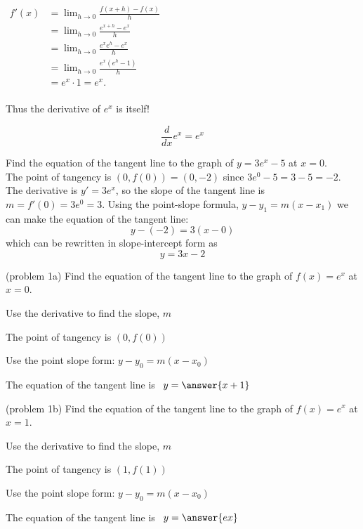 \documentclass{ximera}
\begin{document}
\begin{center}
$\begin{aligned}
f'(x) &= \lim_{h \to 0} \frac{f(x+h)-f(x)}{h} \\[5pt]
&= \lim_{h \to 0}\frac{e^{x+h}-e^x}{h}\\[5pt]
&= \lim_{h \to 0} \frac{e^x e^h-e^x}{h}\\[5pt]
&= \lim_{h \to 0} \frac{e^x (e^h-1)}{h}\\[5pt]
&= e^x \cdot 1 = e^x.\\[-5pt]
\end{aligned}$
\end{center}

Thus the derivative of $e^x$ is itself!

\begin{proposition}
\[
\frac{d}{dx} e^x = e^x
\]
\end{proposition}


\begin{example}[example 1] Find the equation of the tangent line to the graph of $y = 3e^x - 5$ at $x = 0$.\\
The point of tangency is $(0, f(0)) = (0, -2)$ since $3e^0 -5 = 3-5 = -2$. 
The derivative is $y' = 3e^x$, so the slope of the tangent line is $m = f'(0) = 3e^0 = 3$.
Using the point-slope formula, $y - y_1 = m(x-x_1)$ we can make the equation of the tangent line:
\[
y - (-2) = 3(x-0)
\]
which can be rewritten in slope-intercept form as
\[
y = 3x-2
\]
\end{example}


\begin{problem}(problem 1a)
Find the equation of the tangent line to the graph of $f(x) = e^x$ at $x = 0$.
\begin{hint}
Use the derivative to find the slope, $m$
\end{hint}
\begin{hint}
The point of tangency is $(0, f(0))$
\end{hint}
\begin{hint}
Use the point slope form: $y-y_0 = m(x-x_0)$
\end{hint}

The equation of the tangent line is \ $y = \answer{x+1}$
\end{problem}

\begin{problem}(problem 1b)
Find the equation of the tangent line to the graph of $f(x) = e^x$ at $x = 1$.
\begin{hint}
Use the derivative to find the slope, $m$
\end{hint}
\begin{hint}
The point of tangency is $(1, f(1))$
\end{hint}
\begin{hint}
Use the point slope form: $y-y_0 = m(x-x_0)$
\end{hint}

The equation of the tangent line is \ $y = \answer{ex}$
\end{problem}
\end{document}
